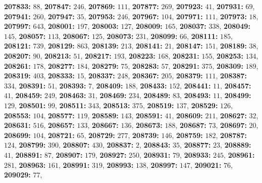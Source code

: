 \textsf{\bfseries 207833:} $88$, \textsf{\bfseries 207847:} $246$, \textsf{\bfseries 207869:} $111$, \textsf{\bfseries 207877:} $269$, \textsf{\bfseries 207923:} $41$, \textsf{\bfseries 207931:} $69$, \textsf{\bfseries 207941:} $260$, \textsf{\bfseries 207947:} $35$, \textsf{\bfseries 207953:} $246$, \textsf{\bfseries 207967:} $104$, \textsf{\bfseries 207971:} $111$, \textsf{\bfseries 207973:} $18$, \textsf{\bfseries 207997:} $643$, \textsf{\bfseries 208001:} $197$, \textsf{\bfseries 208003:} $127$, \textsf{\bfseries 208009:} $165$, \textsf{\bfseries 208037:} $338$, \textsf{\bfseries 208049:} $145$, \textsf{\bfseries 208057:} $113$, \textsf{\bfseries 208067:} $125$, \textsf{\bfseries 208073:} $231$, \textsf{\bfseries 208099:} $66$, \textsf{\bfseries 208111:} $185$, \textsf{\bfseries 208121:} $739$, \textsf{\bfseries 208129:} $863$, \textsf{\bfseries 208139:} $213$, \textsf{\bfseries 208141:} $21$, \textsf{\bfseries 208147:} $151$, \textsf{\bfseries 208189:} $38$, \textsf{\bfseries 208207:} $90$, \textsf{\bfseries 208213:} $51$, \textsf{\bfseries 208217:} $193$, \textsf{\bfseries 208223:} $168$, \textsf{\bfseries 208231:} $155$, \textsf{\bfseries 208253:} $134$, \textsf{\bfseries 208261:} $178$, \textsf{\bfseries 208277:} $184$, \textsf{\bfseries 208279:} $75$, \textsf{\bfseries 208283:} $57$, \textsf{\bfseries 208291:} $375$, \textsf{\bfseries 208309:} $189$, \textsf{\bfseries 208319:} $403$, \textsf{\bfseries 208333:} $15$, \textsf{\bfseries 208337:} $248$, \textsf{\bfseries 208367:} $205$, \textsf{\bfseries 208379:} $111$, \textsf{\bfseries 208387:} $334$, \textsf{\bfseries 208391:} $51$, \textsf{\bfseries 208393:} $7$, \textsf{\bfseries 208409:} $188$, \textsf{\bfseries 208433:} $152$, \textsf{\bfseries 208441:} $11$, \textsf{\bfseries 208457:} $41$, \textsf{\bfseries 208459:} $249$, \textsf{\bfseries 208463:} $31$, \textsf{\bfseries 208469:} $234$, \textsf{\bfseries 208489:} $83$, \textsf{\bfseries 208493:} $11$, \textsf{\bfseries 208499:} $129$, \textsf{\bfseries 208501:} $99$, \textsf{\bfseries 208511:} $343$, \textsf{\bfseries 208513:} $375$, \textsf{\bfseries 208519:} $137$, \textsf{\bfseries 208529:} $126$, \textsf{\bfseries 208553:} $104$, \textsf{\bfseries 208577:} $119$, \textsf{\bfseries 208589:} $143$, \textsf{\bfseries 208591:} $41$, \textsf{\bfseries 208609:} $211$, \textsf{\bfseries 208627:} $32$, \textsf{\bfseries 208631:} $516$, \textsf{\bfseries 208657:} $133$, \textsf{\bfseries 208667:} $136$, \textsf{\bfseries 208673:} $188$, \textsf{\bfseries 208687:} $73$, \textsf{\bfseries 208697:} $20$, \textsf{\bfseries 208699:} $104$, \textsf{\bfseries 208721:} $65$, \textsf{\bfseries 208729:} $277$, \textsf{\bfseries 208739:} $146$, \textsf{\bfseries 208759:} $182$, \textsf{\bfseries 208787:} $124$, \textsf{\bfseries 208799:} $390$, \textsf{\bfseries 208807:} $430$, \textsf{\bfseries 208837:} $2$, \textsf{\bfseries 208843:} $35$, \textsf{\bfseries 208877:} $23$, \textsf{\bfseries 208889:} $41$, \textsf{\bfseries 208891:} $87$, \textsf{\bfseries 208907:} $179$, \textsf{\bfseries 208927:} $250$, \textsf{\bfseries 208931:} $79$, \textsf{\bfseries 208933:} $245$, \textsf{\bfseries 208961:} $281$, \textsf{\bfseries 208963:} $161$, \textsf{\bfseries 208991:} $319$, \textsf{\bfseries 208993:} $138$, \textsf{\bfseries 208997:} $147$, \textsf{\bfseries 209021:} $76$, \textsf{\bfseries 209029:} $77$, 

